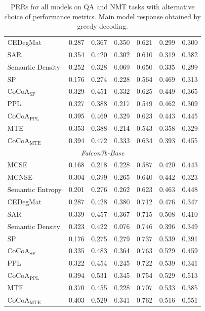\documentclass[11pt]{article}
\begin{document}
\begin{table}[htbp]
{\begin{tabular}{l cc cccc}
CEDegMat & 0.287 & 0.367 & 0.350 & 0.621 & 0.299 & 0.300 \\
SAR & 0.354 & 0.420 & 0.302 & 0.610 & 0.319 & 0.382 \\
Semantic Density & 0.252 & 0.328 & 0.069 & 0.650 & 0.335 & 0.299 \\
SP & 0.176 & 0.274 & 0.228 & 0.564 & 0.469 & 0.313 \\
CoCoA$_{\mathrm{SP}}$ & 0.329 & 0.451 & 0.332 & 0.625 & 0.449 & 0.365 \\
PPL & 0.327 & 0.388 & 0.217 & 0.549 & 0.462 & 0.309 \\
CoCoA$_{\mathrm{PPL}}$ & 0.395 & 0.469 & 0.329 & 0.623 & 0.443 & 0.445 \\
MTE & 0.353 & 0.388 & 0.214 & 0.543 & 0.358 & 0.329 \\
CoCoA$_{\mathrm{MTE}}$ & 0.394 & 0.472 & 0.333 & 0.634 & 0.393 & 0.455 \\
\midrule
\multicolumn{7}{c}{\textit{Falcon7b-Base}} \\
\midrule
MCSE & 0.168 & 0.218 & 0.228 & 0.587 & 0.420 & 0.443 \\
MCNSE & 0.304 & 0.399 & 0.265 & 0.640 & 0.442 & 0.323 \\
Semantic Entropy & 0.201 & 0.276 & 0.262 & 0.623 & 0.463 & 0.448 \\
CEDegMat & 0.287 & 0.428 & 0.380 & 0.712 & 0.476 & 0.347 \\
SAR & 0.339 & 0.457 & 0.367 & 0.715 & 0.508 & 0.410 \\
Semantic Density & 0.323 & 0.422 & 0.076 & 0.746 & 0.396 & 0.349 \\
SP & 0.176 & 0.275 & 0.279 & 0.737 & 0.539 & 0.391 \\
CoCoA$_{\mathrm{SP}}$ & 0.335 & 0.483 & 0.364 & 0.763 & 0.529 & 0.459 \\
PPL & 0.322 & 0.454 & 0.245 & 0.722 & 0.539 & 0.341 \\
CoCoA$_{\mathrm{PPL}}$ & 0.394 & 0.531 & 0.345 & 0.754 & 0.529 & 0.513 \\
MTE & 0.370 & 0.455 & 0.228 & 0.707 & 0.533 & 0.385 \\
CoCoA$_{\mathrm{MTE}}$ & 0.403 & 0.529 & 0.341 & 0.762 & 0.516 & 0.551 \\
\bottomrule
\end{tabular}%
}
\caption{PRRs for all models on QA and NMT tasks with alternative choice of performance metrics. Main model response obtained by greedy decoding.}
\label{tab:cocoa_table14}
\end{table}
\end{document}
